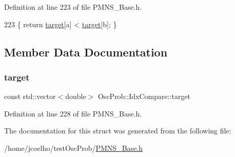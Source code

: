 Definition at line 223 of file P\+M\+N\+S\+\_\+\+Base.\+h.


\begin{DoxyCode}
223 \{ \textcolor{keywordflow}{return} \hyperlink{structOscProb_1_1IdxCompare_ab3258085f0afeb64bf472413bfed43ac}{target}[a] < \hyperlink{structOscProb_1_1IdxCompare_ab3258085f0afeb64bf472413bfed43ac}{target}[b]; \}
\end{DoxyCode}


\subsection{Member Data Documentation}
\mbox{\label{structOscProb_1_1IdxCompare_ab3258085f0afeb64bf472413bfed43ac}} 
\subsubsection{\texorpdfstring{target}{target}}
{\footnotesize\ttfamily const std\+::vector$<$double$>$ Osc\+Prob\+::\+Idx\+Compare\+::target\hspace{0.3cm}{\ttfamily [private]}}



Definition at line 228 of file P\+M\+N\+S\+\_\+\+Base.\+h.



The documentation for this struct was generated from the following file\+:\begin{DoxyCompactItemize}
\item 
/home/jcoelho/test\+Osc\+Prob/\hyperlink{PMNS__Base_8h}{P\+M\+N\+S\+\_\+\+Base.\+h}\end{DoxyCompactItemize}
